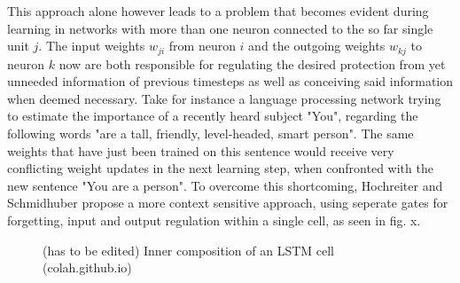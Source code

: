 \documentclass[letterpaper, 10 pt, conference]{ieeeconf}  %
\begin{document}
This approach alone however leads to a problem that becomes evident during learning in networks with more than one neuron
connected to the so far single unit $j$. The input weights $w_{ji}$ from neuron $i$ and the outgoing weights $w_{kj}$ to neuron $k$ now are 
both responsible for regulating the desired protection from yet unneeded information of previous timesteps as well as conceiving said information
when deemed necessary. Take for instance a language processing network trying to estimate the importance of a recently heard subject "You", regarding
the following words "are a tall, friendly, level-headed, smart person". The same weights that have just been trained on this sentence would receive 
very conflicting weight updates in the next learning step, when confronted with the new sentence "You are a person". \newline
To overcome this shortcoming, Hochreiter and Schmidhuber propose a more context sensitive approach, using seperate gates for forgetting, input and
output regulation within a single cell, as seen in fig. x.   

\begin{figure}[thpb]
        \centering
  \caption{(has to be edited) Inner composition of an LSTM cell (colah.github.io)}
        \label{figurelabel}
     \end{figure}
\end{document}
